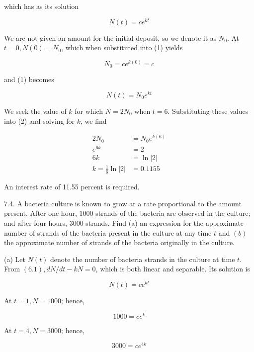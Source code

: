 \documentclass[10pt]{article}
\begin{document}
which has as its solution


\begin{equation*}
N(t)=c e^{k t} \tag{1}
\end{equation*}


We are not given an amount for the initial deposit, so we denote it as $N_{0}$. At $t=0, N(0)=N_{0}$, which when substituted into (1) yields

$$
N_{0}=c e^{k(0)}=c
$$

and (1) becomes


\begin{equation*}
N(t)=N_{0} e^{k t} \tag{2}
\end{equation*}


We seek the value of $k$ for which $N=2 N_{0}$ when $t=6$. Substituting these values into (2) and solving for $k$, we find

$$
\begin{aligned}
2 N_{0} & =N_{0} e^{k(6)} \\
e^{6 k} & =2 \\
6 k & =\ln |2| \\
k=\frac{1}{6} \ln |2| & =0.1155
\end{aligned}
$$

An interest rate of 11.55 percent is required.

7.4. A bacteria culture is known to grow at a rate proportional to the amount present. After one hour, 1000 strands of the bacteria are observed in the culture; and after four hours, 3000 strands. Find (a) an expression for the approximate number of strands of the bacteria present in the culture at any time $t$ and $(b)$ the approximate number of strands of the bacteria originally in the culture.

(a) Let $N(t)$ denote the number of bacteria strands in the culture at time $t$. From $(6.1), d N / d t-k N=0$, which is both linear and separable. Its solution is


\begin{equation*}
N(t)=c e^{k t} \tag{1}
\end{equation*}


At $t=1, N=1000$; hence,


\begin{equation*}
1000=c e^{k} \tag{2}
\end{equation*}


At $t=4, N=3000$; hence,


\begin{equation*}
3000=c e^{4 k} \tag{3}
\end{equation*}
\end{document}
